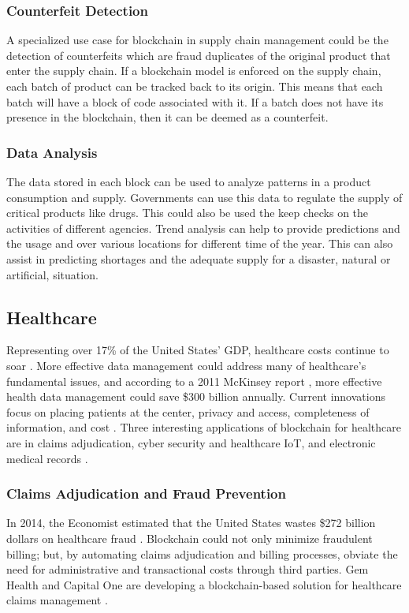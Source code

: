 \documentclass[sigconf]{acmart}
\begin{document}
\subsubsection{Counterfeit Detection} A specialized use case for blockchain in supply chain management could be the detection of counterfeits which are fraud duplicates of the original product that enter the supply chain. If a blockchain model is enforced on the supply chain, each batch of product can be tracked back to its origin. This means that each batch will have a block of code associated with it. If a batch does not have its presence in the blockchain, then it can be deemed as a counterfeit.

\subsubsection{Data Analysis} The data stored in each block can be used to analyze patterns in a product consumption and supply. Governments can use this data to regulate the supply of critical products like drugs. This could also be used the keep checks on the activities of different agencies. Trend analysis can help to provide predictions and the usage and over various locations for different time of the year. This can also assist in predicting shortages and the adequate supply for a disaster, natural or artificial, situation. 

\subsection{Healthcare}
Representing over 17\% of the United States' GDP, healthcare costs continue to soar \cite{hitchingHealthcare}. More effective data management could address many of healthcare's fundamental issues, and according to a 2011 McKinsey report \cite{mckinsey2011}, more effective health data management could save \$300 billion annually. Current innovations focus on placing patients at the center, privacy and access, completeness of information, and cost \cite{hitchingHealthcare}. Three interesting applications of blockchain for healthcare are in claims adjudication, cyber security and healthcare IoT, and electronic medical records \cite{das2017}.

\subsubsection{Claims Adjudication and Fraud Prevention}
In 2014, the Economist estimated that the United States wastes \$272 billion dollars on healthcare fraud \cite{economist2014}. Blockchain could not only minimize fraudulent billing; but, by automating claims adjudication and billing processes, obviate the need for administrative and transactional costs through third parties. Gem Health and Capital One are developing a blockchain-based solution for healthcare claims management \cite{das2017}.
\end{document}
